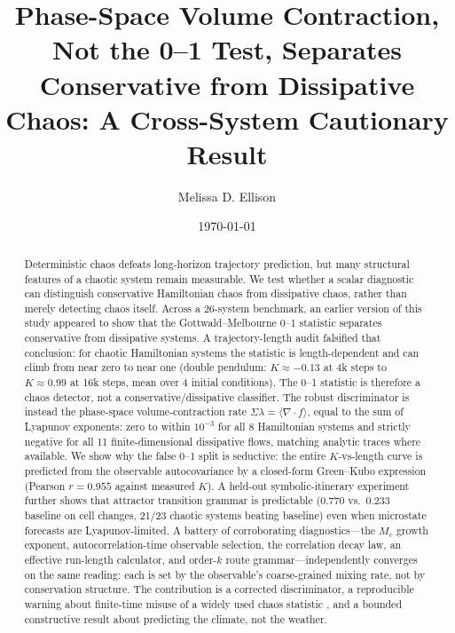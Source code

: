 \documentclass[aip,cha,preprint,amsmath,amssymb,floatfix]{revtex4-2}
\begin{document}
\title{Phase-Space Volume Contraction, Not the 0--1 Test, Separates Conservative from Dissipative Chaos: A Cross-System Cautionary Result}

\author{Melissa D. Ellison}

\date{\today}

\begin{abstract}
Deterministic chaos defeats long-horizon trajectory prediction, but many structural
features of a chaotic system remain measurable. We test whether a scalar diagnostic
can distinguish conservative Hamiltonian chaos from dissipative chaos, rather than
merely detecting chaos itself. Across a 26-system benchmark, an earlier version of
this study appeared to show that the Gottwald--Melbourne 0--1 statistic separates
conservative from dissipative systems. A trajectory-length audit falsified that
conclusion: for chaotic Hamiltonian systems the statistic is length-dependent and
can climb from near zero to near one (double pendulum: $K\approx-0.13$ at 4k steps
to $K\approx0.99$ at 16k steps, mean over 4 initial conditions). The 0--1 statistic
is therefore a chaos detector, not a conservative/dissipative classifier. The robust
discriminator is instead the phase-space volume-contraction rate
$\Sigma\lambda=\langle\nabla\!\cdot f\rangle$, equal to the sum of Lyapunov
exponents: zero to within $10^{-3}$ for all 8 Hamiltonian systems and strictly
negative for all 11 finite-dimensional dissipative flows, matching analytic traces
where available. We show why the false 0--1 split is seductive: the entire
$K$-vs-length curve is predicted from the observable autocovariance by a closed-form
Green--Kubo expression (Pearson $r=0.955$ against measured $K$). A held-out
symbolic-itinerary experiment further shows that attractor transition grammar is
predictable ($0.770$ vs.\ $0.233$ baseline on cell changes, 21/23 chaotic systems
beating baseline) even when microstate forecasts are Lyapunov-limited. A battery of
corroborating diagnostics---the $M_c$ growth exponent, autocorrelation-time
observable selection, the correlation decay law, an effective run-length
calculator, and order-$k$ route grammar---independently converges on the same
reading: each is set by the observable's coarse-grained mixing rate, not by
conservation structure. The
contribution is a corrected discriminator, a reproducible warning about finite-time
misuse of a widely used chaos statistic \cite{falconer2007}, and a bounded
constructive result about predicting the climate, not the weather.
\end{abstract}
\end{document}
